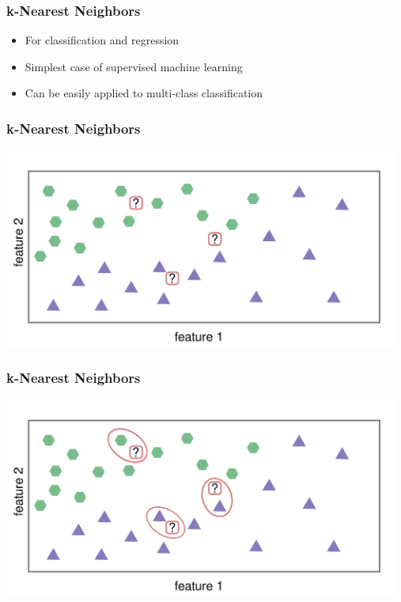\documentclass[aspectratio=169]{beamer}
\begin{document}
\setcounter{tocdepth}{2}
\begin{frame}{}
   \tableofcontents[currentsubsection]
\end{frame}

\begin{frame}
  \frametitle{k-Nearest Neighbors}
  \begin{block}{}
    \begin{center}
      \begin{itemize}
      \item For classification and regression
      \item Simplest case of supervised machine learning
      \item Can be easily applied to multi-class classification
      \end{itemize}
    \end{center}
  \end{block}    
\end{frame}

\begin{frame}
  \frametitle{k-Nearest Neighbors}
  \begin{center}
    \includegraphics[width=13.0cm]{images/k_nearest_neighbour_classification_only_training_data.pdf}
  \end{center}
\end{frame}

\begin{frame}
  \frametitle{k-Nearest Neighbors}
  \begin{center}
    \includegraphics[width=13.0cm]{images/k_nearest_neighbour_classification_k_1.pdf}
  \end{center}
\end{frame}
\end{document}
